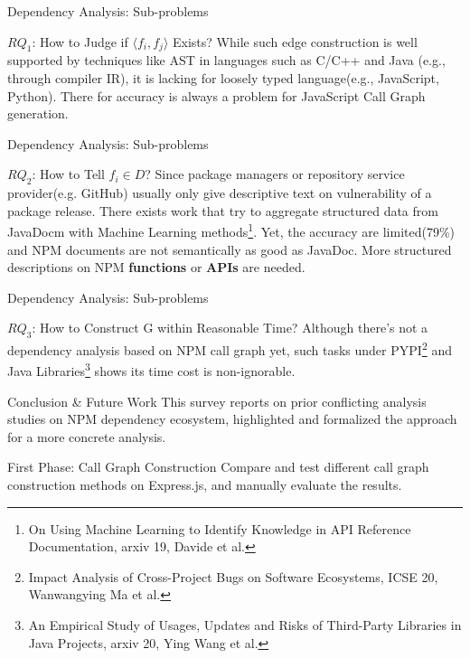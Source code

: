 \documentclass{beamer}
\begin{document}
\begin{frame}{Dependency Analysis: Sub-problems}
\begin{block}{$RQ_1$: How to Judge if $\langle f_i, f_j\rangle$ Exists?}
While such edge construction is well supported by techniques like AST in languages such as C/C++ and Java (e.g., through compiler IR), it is lacking for loosely typed language(e.g., JavaScript, Python). There for accuracy is always a problem for JavaScript Call Graph generation.
\end{block}
\end{frame}

\begin{frame}{Dependency Analysis: Sub-problems}
\begin{block}{$RQ_2$: How to Tell $f_i \in D$?}
Since package managers or repository service provider(e.g. GitHub) usually only give descriptive text on vulnerability of a package release. There exists work that try to aggregate structured data from JavaDocm with Machine Learning methods\footnote{On Using Machine Learning to Identify Knowledge in API Reference Documentation, arxiv 19, Davide et al.}. Yet, the accuracy are limited(79\%) and NPM documents are not semantically as good as JavaDoc. More structured descriptions on NPM \textbf{functions} or \textbf{APIs} are needed.
\end{block}
\end{frame}

\begin{frame}{Dependency Analysis: Sub-problems}
\begin{block}{$RQ_3$: How to Construct G within Reasonable Time?}
Although there's not a dependency analysis based on NPM call graph yet, such tasks under PYPI\footnote{Impact Analysis of Cross-Project Bugs on Software Ecosystems, ICSE 20, Wanwangying Ma et al.} and Java Libraries\footnote{An Empirical Study of Usages, Updates and Risks of Third-Party Libraries in Java Projects, arxiv 20, Ying Wang et al.} shows its time cost is non-ignorable.
\end{block}
\end{frame}

\begin{frame}{Conclusion \& Future Work}
This survey reports on prior conflicting analysis studies on NPM dependency ecosystem, highlighted and formalized the approach for a more concrete analysis. 
\begin{block}{First Phase: Call Graph Construction}
Compare and test different call graph construction methods on Express.js, and manually evaluate the results.
\end{block}
\end{frame}
\end{document}
